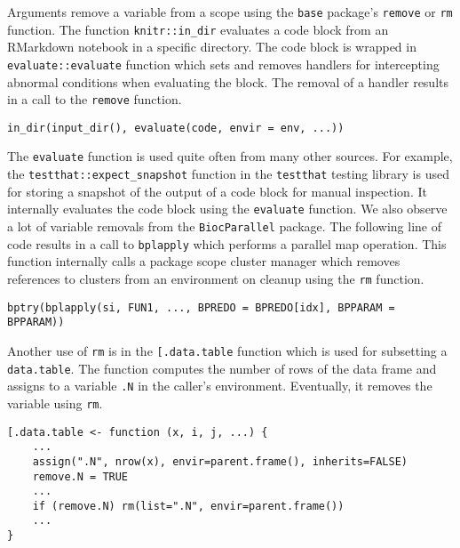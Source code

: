 \documentclass[review,nonacm,screen,acmsmall,anonymous=true]{acmart}
\newcommand{\code}[1]{\lstinline |#1|\xspace}
\begin{document}
Arguments remove a variable from a scope using the \code{base} package's
\code{remove} or \code{rm} function.
%
The function \code{knitr::in_dir} evaluates a code block from an RMarkdown
notebook in a specific directory. The code block is wrapped in
\code{evaluate::evaluate} function which sets and removes handlers for
intercepting abnormal conditions when evaluating the block. The removal of a
handler results in a call to the \code{remove} function.
%
\begin{lstlisting}
in_dir(input_dir(), evaluate(code, envir = env, ...))
\end{lstlisting}
%
The \code{evaluate} function is used quite often from many other sources. For
example, the \code{testthat::expect_snapshot} function in the \code{testthat}
testing library is used for storing a snapshot of the output of a code block for
manual inspection. It internally evaluates the code block using the
\code{evaluate} function.
%
We also observe a lot of variable removals from the \code{BiocParallel} package.
The following line of code results in a call to \code{bplapply} which performs a
parallel map operation. This function internally calls a package scope cluster
manager which removes references to clusters from an environment on cleanup
using the \code{rm} function.
%
\begin{lstlisting}
bptry(bplapply(si, FUN1, ..., BPREDO = BPREDO[idx], BPPARAM = BPPARAM))
\end{lstlisting}

Another use of \code{rm} is in the \code{[.data.table} function which is used
for subsetting a \code{data.table}. The function computes the number of rows of
the data frame and assigns to a variable \code{.N} in the caller's environment.
Eventually, it removes the variable using \code{rm}.
%
\begin{lstlisting}
[.data.table <- function (x, i, j, ...) {
    ...
    assign(".N", nrow(x), envir=parent.frame(), inherits=FALSE)
    remove.N = TRUE
    ...
    if (remove.N) rm(list=".N", envir=parent.frame())
    ...
}
\end{lstlisting}
\end{document}
